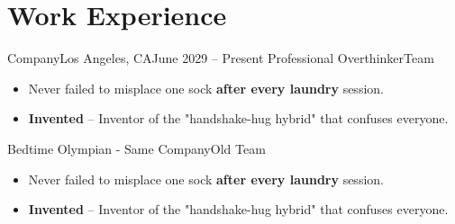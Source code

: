 \section{Work Experience}
  \resumeSubHeadingListStart

     \resumeSubheadingWork
      {Company}{\hspace{-6em}Los Angeles, CA}{June 2029 -- Present}
      {Professional Overthinker}{Team}
      \begin{itemize}[label=\textbf{$\bullet$}]
        \setlength{\itemsep}{-0.15em} %
        \item{Never failed to misplace one sock \textbf{after every laundry} session.}
        \item{\textbf{Invented} – Inventor of the "handshake-hug hybrid" that confuses everyone.}
      \end{itemize}

      \vspace{-3.1em}

     \resumeSubheadingWork
      {}{}{}
      {Bedtime Olympian - Same Company}{Old Team}
      \begin{itemize}[label=\textbf{$\bullet$}]
        \setlength{\itemsep}{-0.15em} %
        \item{Never failed to misplace one sock \textbf{after every laundry} session.}
        \item{\textbf{Invented} – Inventor of the "handshake-hug hybrid" that confuses everyone.}
        \end{itemize}

      \vspace{-1.5em}

